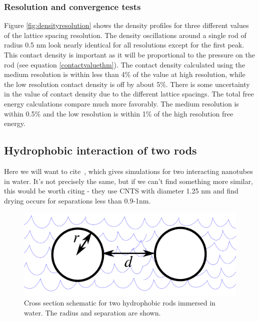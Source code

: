 \documentclass[letterpaper,twocolumn,amsmath,amssymb,prb]{revtex4-1}
\begin{document}
\subsubsection{Resolution and convergence tests}
Figure \ref{fig:densityresolution} shows the density profiles for three
different values of the lattice spacing resolution. The density oscillations
around a single rod of radius 0.5 nm look nearly identical for all resolutions
except for the first peak. This contact density is important as it will be
proportional to the pressure on the rod (see equation \ref{contactvaluethm}). The contact
density calculated using the medium resolution is within less than 4\% of the
value at high resolution, while the low resolution contact density is off by
about 5\%. There is some uncertainty in the value of contact density due to the
different lattice spacings. The total free energy calculations compare much more
favorably. The medium resolution is within 0.5\% and the low resolution is
within 1\% of the high resolution free energy.

\subsection{Hydrophobic interaction of two rods}

Here we will want to cite~\cite{walther2004hydrodynamic}, which gives simulations for 
two interacting
nanotubes in water.  It's not precisely the same, but if we can't find something
more similar, this would be worth citing - they use CNTS with diameter 1.25 nm
and find drying occurs for separations less than 0.9-1nm.


\begin{figure}
\begin{center}
\includegraphics[width=\columnwidth]{figs/rods-diagram}
\end{center}
\caption{ Cross section schematic for two hydrophobic rods immersed in water.
The radius and separation are shown.}
\label{fig:rods}
\end{figure}
\end{document}
